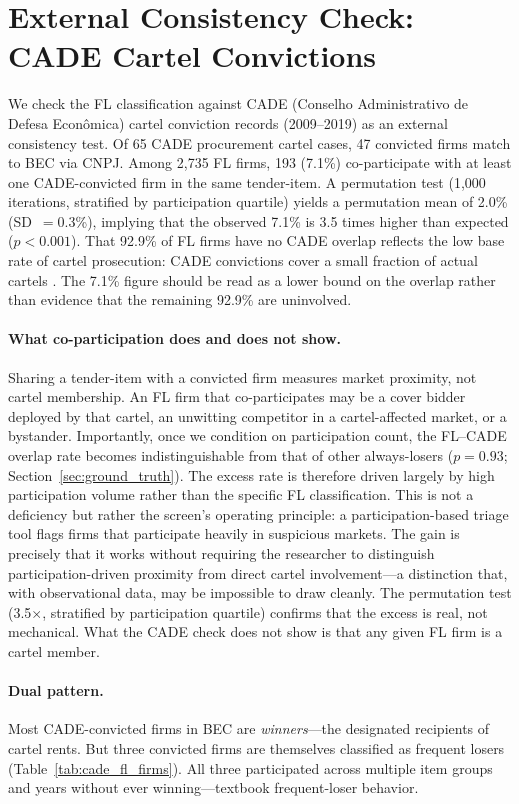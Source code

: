 \section{External Consistency Check: CADE Cartel Convictions}
\label{sec:cade}

We check the FL classification against CADE (Conselho Administrativo
de Defesa Econ\^omica) cartel conviction records (2009--2019) as an
external consistency test. Of 65
CADE procurement cartel cases, 47 convicted firms match to BEC via
CNPJ. Among 2,735 FL firms, 193 (7.1\%) co-participate with at least
one CADE-convicted firm in the same tender-item. A permutation test
(1,000 iterations, stratified by participation quartile) yields a
permutation mean of 2.0\% (SD~$= 0.3$\%), implying that the observed
7.1\% is 3.5 times higher than expected ($p < 0.001$). That 92.9\%
of FL firms have no CADE overlap reflects the low base rate of cartel
prosecution: CADE convictions cover a small fraction of actual cartels
\citep{connor2007price}. The 7.1\% figure should be read as a lower
bound on the overlap rather than evidence that the remaining 92.9\% are
uninvolved.

\paragraph{What co-participation does and does not show.}
Sharing a tender-item with a convicted firm measures market proximity,
not cartel membership. An FL firm that co-participates may be a cover
bidder deployed by that cartel, an unwitting competitor in a
cartel-affected market, or a bystander. Importantly, once we condition
on participation count, the FL--CADE overlap rate becomes
indistinguishable from that of other always-losers ($p = 0.93$;
Section~\ref{sec:ground_truth}). The excess rate is therefore driven
largely by high participation volume rather than the specific FL
classification. This is not a deficiency but rather the screen's operating principle:
a participation-based triage tool flags firms that participate heavily
in suspicious markets. The gain is precisely that it works without
requiring the researcher to distinguish participation-driven proximity
from direct cartel involvement---a distinction that, with observational
data, may be impossible to draw cleanly. The permutation test
(3.5$\times$, stratified by participation quartile) confirms that the
excess is real, not mechanical. What the CADE check does not show is
that any given FL firm is a cartel member.

\paragraph{Dual pattern.}
Most CADE-convicted firms in BEC are \emph{winners}---the designated
recipients of cartel rents. But three convicted firms are themselves
classified as frequent losers (Table~\ref{tab:cade_fl_firms}). All
three participated across multiple item groups and years without ever
winning---textbook frequent-loser behavior.

